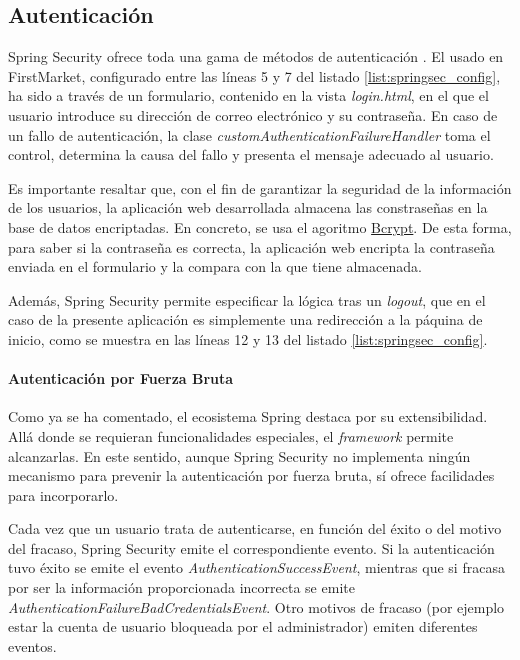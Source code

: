 \documentclass[a4paper,12pt,twoside,openright]{report}
\begin{document}
	\subsection{Autenticación}
	Spring Security ofrece toda una gama de métodos de autenticación \cite{Behler2020} \cite{Alex2020}. El usado en FirstMarket, configurado entre las líneas 5 y 7 del listado \ref{list:springsec_config}, ha sido a través de un formulario, contenido en la vista \emph{login.html}, en el que el usuario introduce su dirección de correo electrónico y su contraseña. En caso de un fallo de autenticación, la clase \emph{customAuthenticationFailureHandler} toma el control, determina la causa del fallo y presenta el mensaje adecuado al usuario.
	
	Es importante resaltar que, con el fin de garantizar la seguridad de la información de los usuarios, la aplicación web desarrollada almacena las constraseñas en la base de datos encriptadas.  En concreto, se usa el agoritmo \href{https://en.wikipedia.org/wiki/Bcrypt}{Bcrypt}. De esta forma, para saber si la contraseña es correcta, la aplicación web encripta la contraseña enviada en el formulario y la compara con la que tiene almacenada.
	
	Además, Spring Security permite especificar la lógica tras un \emph{logout}, que en el caso de la presente aplicación es simplemente una redirección a la páquina de inicio, como se muestra en las líneas 12 y 13 del listado \ref{list:springsec_config}.
	
	\paragraph{Autenticación por Fuerza Bruta}
	Como ya se ha comentado, el ecosistema Spring destaca por su extensibilidad. Allá donde se requieran funcionalidades especiales, el \emph{framework} permite alcanzarlas. En este sentido, aunque Spring Security no implementa ningún mecanismo para prevenir la autenticación por fuerza bruta, sí ofrece facilidades para incorporarlo.
	
	Cada vez que un usuario trata de autenticarse, en función del éxito o del motivo del fracaso, Spring Security emite el correspondiente evento. Si la autenticación tuvo éxito se emite el evento \emph{AuthenticationSuccessEvent}, mientras que si fracasa por ser la información proporcionada incorrecta se emite \emph{AuthenticationFailureBadCredentialsEvent}. Otro motivos de fracaso (por ejemplo estar la cuenta de usuario bloqueada por el administrador) emiten diferentes eventos.
	
\end{document}
